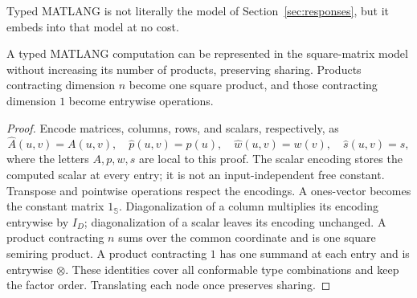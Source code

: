 Typed MATLANG is not literally the model of Section~\ref{sec:responses}, but
it embeds into that model at no cost.
\begin{lemma}\label{lem:broadcast}
A typed MATLANG computation can be represented in the square-matrix model
without increasing its number of products, preserving sharing. Products
contracting dimension $n$ become one square product, and those contracting
dimension $1$ become entrywise operations.
\end{lemma}
\begin{proof}
Encode matrices, columns, rows, and scalars, respectively, as
\[
 \widehat A(u,v)=A(u,v),\quad \widehat p(u,v)=p(u),\quad
 \widehat w(u,v)=w(v),\quad \widehat s(u,v)=s,
\]
where the letters $A,p,w,s$ are local to this proof.
The scalar encoding stores the computed scalar at every entry; it is not an
input-independent free constant. Transpose and pointwise operations respect
the encodings. A ones-vector becomes the constant matrix $1_{\mathbb S}$.
Diagonalization of a column multiplies its encoding entrywise by $I_D$;
diagonalization of a scalar leaves its encoding unchanged. A product
contracting $n$ sums over the common coordinate and is one square semiring
product. A product contracting $1$ has one summand at each entry and is
entrywise $\otimes$. These identities cover all conformable type
combinations and keep the factor order. Translating each node once preserves
sharing.
\end{proof}

